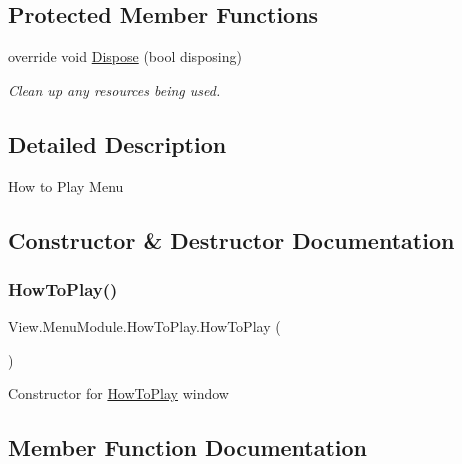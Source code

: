 \subsection*{Protected Member Functions}
\begin{DoxyCompactItemize}
\item 
override void \hyperlink{class_view_1_1_menu_module_1_1_how_to_play_af499cad4592b0325d662fd084710c0a2}{Dispose} (bool disposing)
\begin{DoxyCompactList}\small\item\em Clean up any resources being used. \end{DoxyCompactList}\end{DoxyCompactItemize}


\subsection{Detailed Description}
How to Play Menu 



\subsection{Constructor \& Destructor Documentation}
\hypertarget{class_view_1_1_menu_module_1_1_how_to_play_a78140fa357d8f951aabc5b44ac50591e}{}\label{class_view_1_1_menu_module_1_1_how_to_play_a78140fa357d8f951aabc5b44ac50591e} 
\subsubsection{\texorpdfstring{How\+To\+Play()}{HowToPlay()}}
{\footnotesize\ttfamily View.\+Menu\+Module.\+How\+To\+Play.\+How\+To\+Play (\begin{DoxyParamCaption}{ }\end{DoxyParamCaption})\hspace{0.3cm}{\ttfamily [inline]}}

Constructor for \hyperlink{class_view_1_1_menu_module_1_1_how_to_play}{How\+To\+Play} window 

\subsection{Member Function Documentation}
\hypertarget{class_view_1_1_menu_module_1_1_how_to_play_af499cad4592b0325d662fd084710c0a2}{}\label{class_view_1_1_menu_module_1_1_how_to_play_af499cad4592b0325d662fd084710c0a2} 
